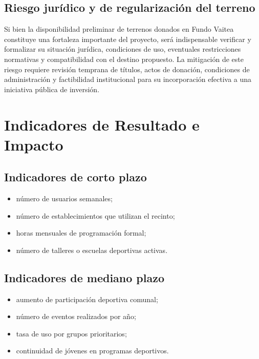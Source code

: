 \documentclass[12pt,letterpaper]{article}
\begin{document}
\subsection{Riesgo jurídico y de regularización del terreno}

Si bien la disponibilidad preliminar de terrenos donados en Fundo Vaitea constituye una fortaleza importante del proyecto, será indispensable verificar y formalizar su situación jurídica, condiciones de uso, eventuales restricciones normativas y compatibilidad con el destino propuesto. La mitigación de este riesgo requiere revisión temprana de títulos, actos de donación, condiciones de administración y factibilidad institucional para su incorporación efectiva a una iniciativa pública de inversión.

\section{Indicadores de Resultado e Impacto}

\subsection{Indicadores de corto plazo}

\begin{itemize}
    \item número de usuarios semanales;
    \item número de establecimientos que utilizan el recinto;
    \item horas mensuales de programación formal;
    \item número de talleres o escuelas deportivas activas.
\end{itemize}

\subsection{Indicadores de mediano plazo}

\begin{itemize}
    \item aumento de participación deportiva comunal;
    \item número de eventos realizados por año;
    \item tasa de uso por grupos prioritarios;
    \item continuidad de jóvenes en programas deportivos.
\end{itemize}
\end{document}
